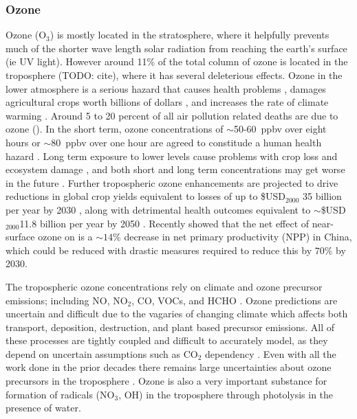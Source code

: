     \subsubsection{Ozone}
      Ozone (O$_3$) is mostly located in the stratosphere, where it helpfully prevents much of the shorter wave length solar radiation from reaching the earth's surface (ie UV light).
      However around 11\% of the total column of ozone is located in the troposphere (TODO: cite), where it has several deleterious effects.
      Ozone in the lower atmosphere is a serious hazard that causes health problems \citep{Hsieh2013}, damages agricultural crops worth billions of dollars \citep{Avnery2011,Yue2017}, and increases the rate of climate warming \citep{IPCC_2013_chap8}.
      Around 5 to 20 percent of all air pollution related deaths are due to ozone (\cite{Monks2015}).
      In the short term, ozone concentrations of $\sim$50-60~ppbv over eight hours or $\sim$80~ppbv over one hour are agreed to constitude a human health hazard \citep{Ayers2006,Lelieveld2009}. 
      Long term exposure to lower levels cause problems with crop loss and ecosystem damage \citep{Emberson2003}, and both short and long term concentrations may get worse in the future \citep{Lelieveld2009, Stevenson2013}.
      Further tropospheric ozone enhancements are projected to drive reductions in global crop yields equivalent to losses of up to \$USD$_{2000}$ 35 billion per year by 2030 \citep{Avnery2011}, along with detrimental health outcomes equivalent to $\sim$\$USD$_{2000}$11.8 billion per year by 2050 \citep{Selin2009}.
      Recently \cite{Yue2017} showed that the net effect of near-surface ozone on is a $\sim 14\%$ decrease in net primary productivity (NPP) in China, which could be reduced with drastic measures required to reduce this by $70\%$ by 2030.
      
      The tropospheric ozone concentrations rely on climate and ozone precursor emissions; including NO, NO$_2$, CO, VOCs, and HCHO \citep{Atkinson2000, Young2013, Marvin2017}. 
      Ozone predictions are uncertain and difficult due to the vagaries of changing climate which affects both transport, deposition, destruction, and plant based precursor emissions.
      All of these processes are tightly coupled and difficult to accurately model, as they depend on uncertain assumptions such as CO$_2$ dependency \citep{Young2013}.
      Even with all the work done in the prior decades there remains large uncertainties about ozone precursors in the troposphere \citep{Mazzuca2016}.
      Ozone is also a very important substance for formation of radicals (NO$_3$, OH) in the troposphere through photolysis in the presence of water.
    
